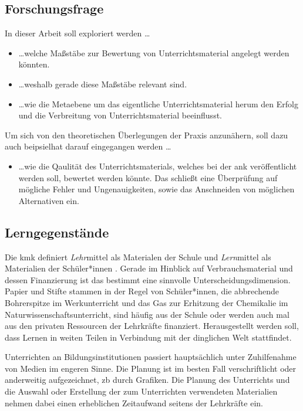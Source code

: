 \subsection{Forschungsfrage}
In dieser Arbeit soll exploriert werden \dots 
\begin{itemize}
    \item \dots welche Maßstäbe zur Bewertung von Unterrichtsmaterial angelegt werden könnten. 
    \item \dots weshalb gerade diese Maßstäbe relevant sind. 
    \item \dots wie die Metaebene um das eigentliche Unterrichtsmaterial herum den Erfolg und die Verbreitung von Unterrichtsmaterial beeinflusst. 
\end{itemize}
Um sich von den theoretischen Überlegungen der Praxis anzunähern, soll dazu auch beipsielhat darauf eingegangen werden \dots
\begin{itemize}
    \item \dots wie die Qaulität des Unterrichtsmaterials, welches bei der \acrlong{ank} veröffentlicht werden soll, bewertet werden könnte. Das schließt eine Überprüfung auf mögliche Fehler und Ungenauigkeiten, sowie das Anschneiden von möglichen Alternativen ein. 
\end{itemize}





\subsection{Lerngegenstände}
Die \gls{kmk} definiert \emph{Lehr}mittel als Materialen der Schule und \emph{Lern}mittel als Materialien der Schüler*innen \autocite{KMKMittel}. Gerade im Hinblick auf Verbrauchsmaterial und dessen Finanzierung ist das bestimmt eine sinnvolle Unterscheidungsdimension. Papier und Stifte stammen in der Regel von Schüler*innen, die abbrechende Bohrerspitze im Werkunterricht und %
das Gas zur Erhitzung der Chemikalie im Naturwissenschaftsunterricht, sind häufig aus der Schule oder werden auch mal aus den privaten Ressourcen der Lehrkräfte finanziert. Herausgestellt werden soll, dass Lernen in weiten Teilen in Verbindung mit der dinglichen Welt stattfindet.

Unterrichten an Bildungsinstitutionen passiert hauptsächlich unter Zuhilfenahme von Medien im engeren Sinne. Die Planung ist im besten Fall verschriftlicht oder anderweitig aufgezeichnet, \gls{zb} durch Grafiken. Die Planung des Unterrichts und die Auswahl oder Erstellung der zum Unterrichten verwendeten Materialien nehmen dabei einen erheblichen Zeitaufwand seitens der Lehrkräfte ein.


